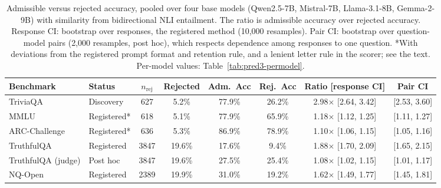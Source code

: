 \begin{table}[t]
\centering
\footnotesize
\setlength{\tabcolsep}{3pt}
\begin{tabular}{llcccccc}
\toprule
Benchmark & Status & $n_{\text{rej}}$ & Rejected & Adm.\ Acc & Rej.\ Acc & Ratio [response CI] & Pair CI \\
\midrule
TriviaQA & Discovery & 627 & 5.2\% & 77.9\% & 26.2\% & 2.98$\times$ [2.64, 3.42] & [2.53, 3.60] \\
MMLU & Registered* & 618 & 5.1\% & 77.9\% & 65.9\% & 1.18$\times$ [1.12, 1.25] & [1.11, 1.27] \\
ARC-Challenge & Registered* & 636 & 5.3\% & 86.9\% & 78.9\% & 1.10$\times$ [1.06, 1.15] & [1.05, 1.16] \\
TruthfulQA & Registered & 3847 & 19.6\% & 17.6\% & 9.4\% & 1.88$\times$ [1.70, 2.09] & [1.65, 2.15] \\
TruthfulQA (judge) & Post hoc & 3847 & 19.6\% & 27.5\% & 25.4\% & 1.08$\times$ [1.02, 1.15] & [1.01, 1.17] \\
NQ-Open & Registered & 2389 & 19.9\% & 31.0\% & 19.2\% & 1.62$\times$ [1.49, 1.77] & [1.45, 1.81] \\
\bottomrule
\end{tabular}
\caption{Admissible versus rejected accuracy, pooled over four base models (Qwen2.5-7B, Mistral-7B, Llama-3.1-8B, Gemma-2-9B) with similarity from bidirectional NLI entailment. The ratio is admissible accuracy over rejected accuracy. Response CI: bootstrap over responses, the registered method (10,000 resamples). Pair CI: bootstrap over question-model pairs (2,000 resamples, post hoc), which respects dependence among responses to one question. *With deviations from the registered prompt format and retention rule, and a lenient letter rule in the scorer; see the text. Per-model values: Table~\ref{tab:pred3-permodel}.}
\label{tab:pred3-results}
\end{table}
